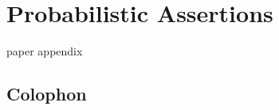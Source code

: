 \documentclass[ twoside,openright,titlepage,numbers=noenddot,headinclude,
                footinclude=true,cleardoublepage=empty,abstractoff,%
                BCOR=5mm,paper=letter,fontsize=11pt,letterpaper,%
                american,%
                ]{scrreprt}
\newcounter{dummy}
\begin{document}
\chapter{Probabilistic Assertions}
\label{ch:passert}
{paper}
{appendix}


\manualmark
\markboth{\spacedlowsmallcaps{\bibname}}{\spacedlowsmallcaps{\bibname}} %
{}

\label{app:bibliography}



\cleardoublepage
\pagestyle{empty}
\vspace*{20ex}
\section*{Colophon}

\end{document}
